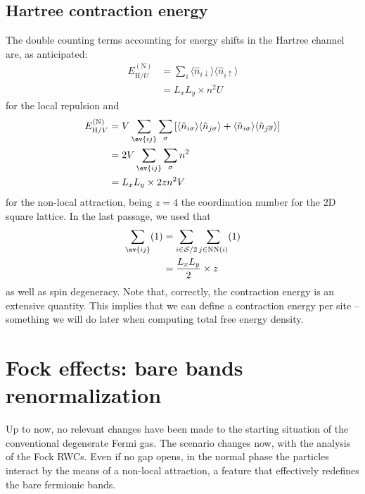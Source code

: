 \subsection{Hartree contraction energy}\label{subsec:normal-hartree-energy}

The double counting terms accounting for energy shifts in the Hartree channel are, as anticipated:
\begin{align}
	E_{\mathrm{H}/U}^{(\mathrm{N})} &= \sum_i \langle 
		\hat n_{i\downarrow}
	\rangle \langle 
		\hat n_{i\uparrow}
	\rangle \\
	&= L_x L_y \times n^2U \label{eq:normal-hartree-U-contraction-energy}
\end{align}
for the local repulsion and 
\begin{align}
	E_{\mathrm{H}/V}^{(\mathrm{N})} &= V \sum_{\ev{ij}} \sum_\sigma \left[
		\langle 
			\hat n_{i\sigma}
		\rangle \langle 
			\hat n_{j\sigma}
		\rangle
		+
		\langle 
			\hat n_{i\sigma}
		\rangle \langle 
			\hat n_{j\overline{\sigma}}
		\rangle
	\right]\\
	&= 2V \sum_{\ev{ij}} \sum_\sigma n^2 \\
	&= L_x L_y \times 2zn^2 V \label{eq:normal-hartree-V-contraction-energy}
\end{align}
for the non-local attraction, being $z=4$ the coordination number for the $2$D square lattice. In the last passage, we used that
\[
\begin{aligned}
	\sum_{\ev{ij}} (1) &= \sum_{i\in\mathcal{S}/2} \sum_{j\in\mathrm{NN}(i)} (1) \\
	&= \frac{L_x L_y}{2} \times z
\end{aligned}
\]
as well as spin degeneracy. Note that, correctly, the contraction energy is an extensive quantity. This implies that we can define a contraction energy per site -- something we will do later when computing total free energy density.

\section{Fock effects: bare bands renormalization}\label{sec:normal-fock-bands-renormalization}

Up to now, no relevant changes have been made to the starting situation of the conventional degenerate Fermi gas. The scenario changes now, with the analysis of the Fock RWCs. Even if no gap opens, in the normal phase the particles interact by the means of a non-local attraction, a feature that effectively redefines the bare fermionic bands.

